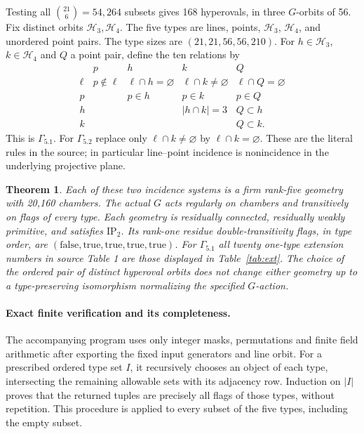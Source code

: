 \documentclass[11pt]{article}
\newtheorem{theorem}{Theorem}\newtheorem{lemma}{Lemma}
\begin{document}
Testing all $\binom{21}{6}=54,264$ subsets gives 168 hyperovals, in three
$G$-orbits of 56. Fix distinct orbits $\mathcal H_3,\mathcal H_4$.
The five types are lines, points, $\mathcal H_3$, $\mathcal H_4$, and
unordered point pairs. The type sizes are $(21,21,56,56,210)$.
For $h\in\mathcal H_3$, $k\in\mathcal H_4$ and $Q$ a point pair, define
the ten relations by
\[
\begin{array}{c|cccc}
 &p&h&k&Q\\\hline
\ell&p\notin\ell&\ell\cap h=\varnothing&
 \ell\cap k\ne\varnothing&\ell\cap Q=\varnothing\\
p&&p\in h&p\in k&p\in Q\\
h&&&|h\cap k|=3&Q\subset h\\
k&&&&Q\subset k .
\end{array}                                                     \tag{2}
\]
This is $\Gamma_{5.1}$. For $\Gamma_{5.2}$ replace only
$\ell\cap k\ne\varnothing$ by $\ell\cap k=\varnothing$.
These are the literal rules in the source; in particular line--point
incidence is nonincidence in the underlying projective plane.

\begin{theorem}
Each of these two incidence systems is a firm rank-five geometry with
20,160 chambers. The actual $G$ acts regularly on chambers and transitively
on flags of every type. Each geometry is residually connected, residually
weakly primitive, and satisfies $\mathrm{IP}_2$. Its rank-one residue
double-transitivity flags, in type order, are
$(\mathrm{false},\mathrm{true},\mathrm{true},\mathrm{true},\mathrm{true})$.
For $\Gamma_{5.1}$ all twenty one-type
extension numbers in source Table 1 are those displayed in Table~\ref{tab:ext}.
The choice of the ordered pair of distinct hyperoval orbits does not change
either geometry up to a type-preserving isomorphism normalizing the
specified $G$-action.
\end{theorem}

\paragraph{Exact finite verification and its completeness.}
The accompanying program uses only integer masks, permutations and finite
field arithmetic after exporting the fixed input generators and line orbit.
For a prescribed ordered type set $I$, it recursively chooses an object of
each type, intersecting the remaining allowable sets with its adjacency
row. Induction on $|I|$ proves that the returned tuples are precisely all
flags of those types, without repetition. This procedure is applied to
every subset of the five types, including the empty subset.
\end{document}
